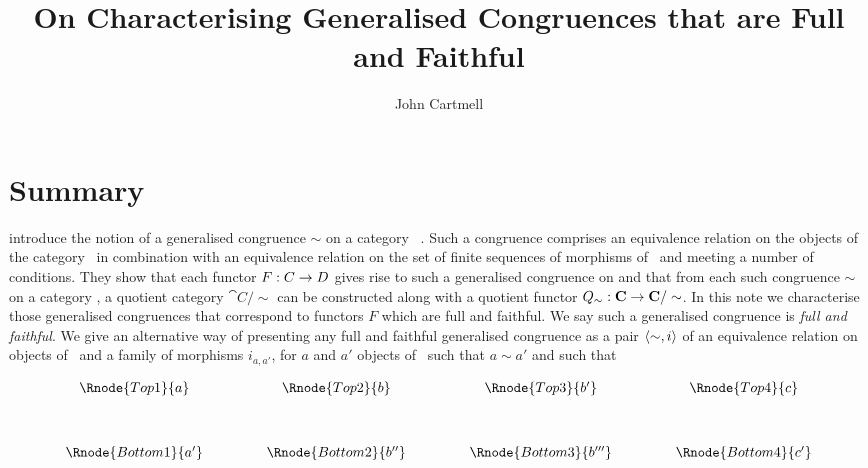 \documentclass[10pt,a4paper]{article}
\theoremstyle{remark}
\newcommand{\catc}{\cat{C}}
\newcommand{\catcw}{\cat{C}\ }
\newcommand{\term}[1]{\textit{#1}}  %
\begin{document}
\title{On Characterising Generalised Congruences that are Full and Faithful}


\author{John Cartmell}

\maketitle
\iffalse
\begin{center}
DRAFT
\end{center}
\fi

\section{Summary}

\cite{Bednarczyk1999} introduce the notion of a generalised congruence $\sim$ on a category
\catcw. Such a congruence comprises 
an equivalence relation  on the objects of the category \catcw in combination
with an equivalence relation
on the set of finite sequences of morphisms of \catcw and meeting a number of conditions. 
They show that each functor $F: C \rightarrow D$ 
gives rise to such a generalised congruence on \catc and that from each such congruence 
$\sim$ on a category \catc, a quotient category $\catc/\sim$ can be constructed along with a quotient functor $Q_\sim:\catc \morph \catc/\sim$.  
In this note we characterise those
generalised congruences that correspond to functors $F$ which are full and faithful. 
We say such a generalised congruence is \term{full and faithful}. We give an alternative way of presenting any full and faithful generalised congruence as a pair $\langle\sim,i\rangle$ of  an equivalence
relation on objects of \catcw and a family of morphisms $i_{a,a'}$, for $a$ and $a'$ objects
of \catcw such that $a \sim a'$ and such that 


\begin{center}
\begin{displaymath}
\begin{array}{cp{.9cm}cp{.9cm}cp{.9cm}c}
\Rnode{Top1}{a} & & \Rnode{Top2}{b}  & & \Rnode{Top3}{b'} && \Rnode{Top4}{c}\\ [1.2cm]
\Rnode{Bottom1}{a'} & & \Rnode{Bottom2}{b''}  & & \Rnode{Bottom3}{b'''} && \Rnode{Bottom4}{c'}
\end{array}
\end{displaymath}

\end{center}
\end{document}
